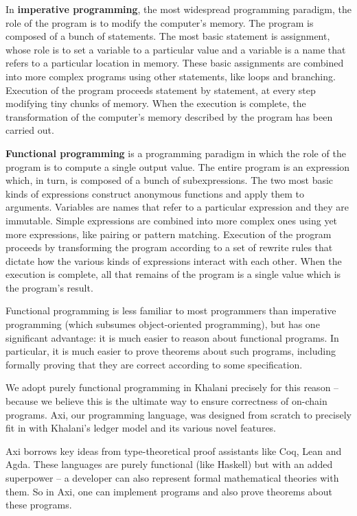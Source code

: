 \documentclass[a4paper]{article}
\begin{document}
In \textbf{imperative programming}, the most widespread programming paradigm, the role of the program is to modify the computer’s memory. The program is composed of a bunch of statements. The most basic statement is assignment, whose role is to set a variable to a particular value and a variable is a name that refers to a particular location in memory. These basic assignments are combined into more complex programs using other statements, like loops and branching. Execution of the program proceeds statement by statement, at every step modifying tiny chunks of memory. When the execution is complete, the transformation of the computer’s memory described by the program has been carried out.

\textbf{Functional programming} is a programming paradigm in which the role of the program is to compute a single output value. The entire program is an expression which, in turn, is composed of a bunch of subexpressions. The two most basic kinds of expressions construct anonymous functions and apply them to arguments. Variables are names that refer to a particular expression and they are immutable. Simple expressions are combined into more complex ones using yet more expressions, like pairing or pattern matching. Execution of the program proceeds by transforming the program according to a set of rewrite rules that dictate how the various kinds of expressions interact with each other. When the execution is complete, all that remains of the program is a single value which is the program’s result.

Functional programming is less familiar to most programmers than imperative programming (which subsumes object-oriented programming), but has one significant advantage: it is much easier to reason about functional programs. In particular, it is much easier to prove theorems about such programs, including formally proving that they are correct according to some specification.

We adopt purely functional programming in Khalani precisely for this reason -- because we believe this is the ultimate way to ensure correctness of on-chain programs. Axi, our programming language, was designed from scratch to precisely fit in with Khalani’s ledger model and its various novel features.

Axi borrows key ideas from type-theoretical proof assistants like Coq, Lean and Agda. These languages are purely functional (like Haskell) but with an added superpower -- a developer can also represent formal mathematical theories with them. So in Axi, one can implement programs and also prove theorems about these programs.
\end{document}
